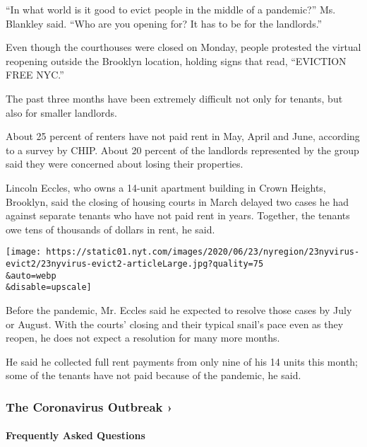``In what world is it good to evict people in the middle of a
pandemic?'' Ms. Blankley said. ``Who are you opening for? It has to be
for the landlords.''

Even though the courthouses were closed on Monday, people protested the
virtual reopening outside the Brooklyn location, holding signs that
read, ``EVICTION FREE NYC.''

The past three months have been extremely difficult not only for
tenants, but also for smaller landlords.

About 25 percent of renters have not paid rent in May, April and June,
according to a survey by CHIP. About 20 percent of the landlords
represented by the group said they were concerned about losing their
properties.

Lincoln Eccles, who owns a 14-unit apartment building in Crown Heights,
Brooklyn, said the closing of housing courts in March delayed two cases
he had against separate tenants who have not paid rent in years.
Together, the tenants owe tens of thousands of dollars in rent, he said.

\texttt{[image: https://static01.nyt.com/images/2020/06/23/nyregion/23nyvirus-evict2/23nyvirus-evict2-articleLarge.jpg?quality=75\\\&auto=webp\\\&disable=upscale]}

Before the pandemic, Mr. Eccles said he expected to resolve those cases
by July or August. With the courts' closing and their typical snail's
pace even as they reopen, he does not expect a resolution for many more
months.

He said he collected full rent payments from only nine of his 14 units
this month; some of the tenants have not paid because of the pandemic,
he said.

\href{https://www.nytimes.com/news-event/coronavirus?action=click\&pgtype=Article\&state=default\&region=MAIN_CONTENT_3\&context=storylines_faq}{}

\hypertarget{the-coronavirus-outbreak-}{%
\subsubsection{The Coronavirus Outbreak
›}\label{the-coronavirus-outbreak-}}

\hypertarget{frequently-asked-questions}{%
\paragraph{Frequently Asked
Questions}\label{frequently-asked-questions}}

